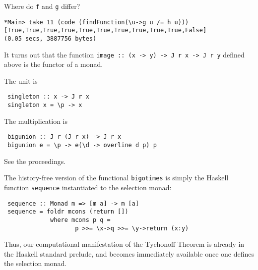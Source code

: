 \documentclass%
[%
Screen4to3,
]{foils}
\begin{document}
Where do \verb+f+ and \verb+g+
differ?

\vfill

\begin{verbatim}
*Main> take 11 (code (findFunction(\u->g u /= h u))) 
[True,True,True,True,True,True,True,True,True,True,False]
(0.05 secs, 3887756 bytes)
\end{verbatim}

\vfill





It turns out that the function \verb+image :: (x -> y) -> J r x -> J r y+
defined above is the functor of a monad.  

\vfill

The unit is
\begin{verbatim}
 singleton :: x -> J r x
 singleton x = \p -> x
\end{verbatim}

\vfill

The multiplication is
\begin{verbatim}
 bigunion :: J r (J r x) -> J r x
 bigunion e = \p -> e(\d -> overline d p) p
\end{verbatim}



See the proceedings.


The history-free version of the functional \verb+bigotimes+ is simply
the Haskell  function \verb+sequence+
instantiated to the selection monad:
\begin{verbatim}
 sequence :: Monad m => [m a] -> m [a] 
 sequence = foldr mcons (return [])
             where mcons p q = 
                    p >>= \x->q >>= \y->return (x:y)
\end{verbatim}

\vfill

Thus, our computational manifestation of the Tychonoff Theorem is
already in the Haskell standard prelude, and becomes immediately
available once one defines the selection monad.
\end{document}
